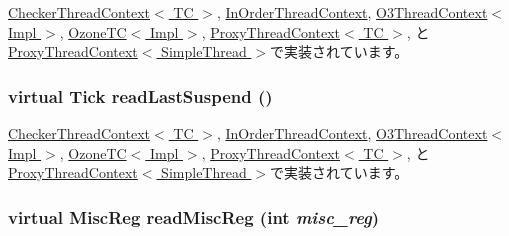 \hyperlink{classCheckerThreadContext_afaa8f9eb8d809cccd31829ba793a433a}{CheckerThreadContext$<$ TC $>$}, \hyperlink{classInOrderThreadContext_afaa8f9eb8d809cccd31829ba793a433a}{InOrderThreadContext}, \hyperlink{classO3ThreadContext_afaa8f9eb8d809cccd31829ba793a433a}{O3ThreadContext$<$ Impl $>$}, \hyperlink{classOzoneCPU_1_1OzoneTC_afaa8f9eb8d809cccd31829ba793a433a}{OzoneTC$<$ Impl $>$}, \hyperlink{classProxyThreadContext_afaa8f9eb8d809cccd31829ba793a433a}{ProxyThreadContext$<$ TC $>$}, と \hyperlink{classProxyThreadContext_afaa8f9eb8d809cccd31829ba793a433a}{ProxyThreadContext$<$ SimpleThread $>$}で実装されています。\hypertarget{classThreadContext_affe95ad96bb334a8132f9c69291f39a4}{
\subsubsection[{readLastSuspend}]{\setlength{\rightskip}{0pt plus 5cm}virtual {\bf Tick} readLastSuspend ()}}
\label{classThreadContext_affe95ad96bb334a8132f9c69291f39a4}


\hyperlink{classCheckerThreadContext_a7d0b0631c7087d361f6ae11379c06b15}{CheckerThreadContext$<$ TC $>$}, \hyperlink{classInOrderThreadContext_a7d0b0631c7087d361f6ae11379c06b15}{InOrderThreadContext}, \hyperlink{classO3ThreadContext_a7d0b0631c7087d361f6ae11379c06b15}{O3ThreadContext$<$ Impl $>$}, \hyperlink{classOzoneCPU_1_1OzoneTC_a7d0b0631c7087d361f6ae11379c06b15}{OzoneTC$<$ Impl $>$}, \hyperlink{classProxyThreadContext_a7d0b0631c7087d361f6ae11379c06b15}{ProxyThreadContext$<$ TC $>$}, と \hyperlink{classProxyThreadContext_a7d0b0631c7087d361f6ae11379c06b15}{ProxyThreadContext$<$ SimpleThread $>$}で実装されています。\hypertarget{classThreadContext_a6888f4bff21e34892e59654ea80073b2}{
\subsubsection[{readMiscReg}]{\setlength{\rightskip}{0pt plus 5cm}virtual {\bf MiscReg} readMiscReg (int {\em misc\_\-reg})}}
\label{classThreadContext_a6888f4bff21e34892e59654ea80073b2}


